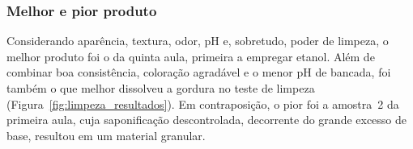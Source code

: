 \subsubsection{Melhor e pior produto}

Considerando aparência, textura, odor, pH e, sobretudo, poder de limpeza, o melhor produto foi o da quinta aula, primeira a empregar etanol. Além de combinar boa consistência, coloração agradável e o menor pH de bancada, foi também o que melhor dissolveu a gordura no teste de limpeza (Figura~\ref{fig:limpeza_resultados}). Em contraposição, o pior foi a amostra~2 da primeira aula, cuja saponificação descontrolada, decorrente do grande excesso de base, resultou em um material granular.
